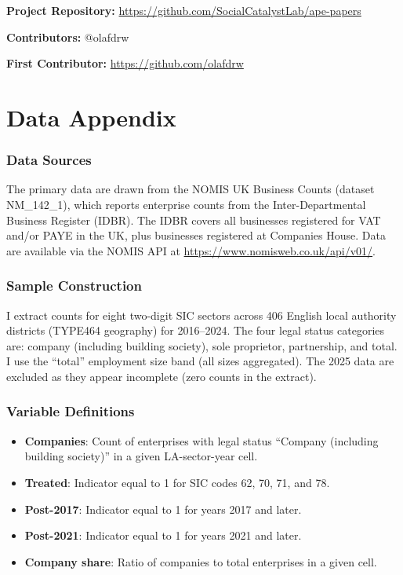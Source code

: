 \documentclass[12pt]{article}
\begin{document}
\noindent\textbf{Project Repository:} \url{https://github.com/SocialCatalystLab/ape-papers}

\noindent\textbf{Contributors:} @olafdrw

\noindent\textbf{First Contributor:} \url{https://github.com/olafdrw}

\label{apep_main_text_end}
\newpage


\newpage
\appendix

\section{Data Appendix}

\subsubsection*{Data Sources} The primary data are drawn from the NOMIS UK Business Counts (dataset NM\_142\_1), which reports enterprise counts from the Inter-Departmental Business Register (IDBR). The IDBR covers all businesses registered for VAT and/or PAYE in the UK, plus businesses registered at Companies House. Data are available via the NOMIS API at \url{https://www.nomisweb.co.uk/api/v01/}.

\subsubsection*{Sample Construction} I extract counts for eight two-digit SIC sectors across 406 English local authority districts (TYPE464 geography) for 2016--2024. The four legal status categories are: company (including building society), sole proprietor, partnership, and total. I use the ``total'' employment size band (all sizes aggregated). The 2025 data are excluded as they appear incomplete (zero counts in the extract).

\subsubsection*{Variable Definitions}
\begin{itemize}
\item \textbf{Companies}: Count of enterprises with legal status ``Company (including building society)'' in a given LA-sector-year cell.
\item \textbf{Treated}: Indicator equal to 1 for SIC codes 62, 70, 71, and 78.
\item \textbf{Post-2017}: Indicator equal to 1 for years 2017 and later.
\item \textbf{Post-2021}: Indicator equal to 1 for years 2021 and later.
\item \textbf{Company share}: Ratio of companies to total enterprises in a given cell.
\end{itemize}
\end{document}
